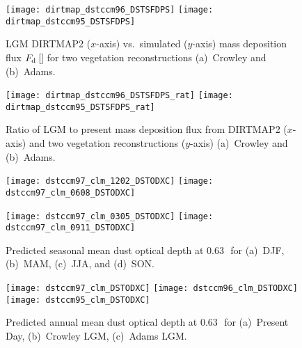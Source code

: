 \documentclass[final,dvips]{foils}
\begin{document}
\rotatefoilhead{\bgl
\Large\textcolor{blue}{\hfill LGM Dust \& Loess Deposition\hfill}}\vspace{-0.5in}\large
\begin{figure}
\centering
\texttt{[image: dirtmap\_dstccm96\_DSTSFDPS]}%
\texttt{[image: dirtmap\_dstccm95\_DSTSFDPS]}
\caption{
LGM DIRTMAP2 \cite[]{KoH01} ($x$-axis) vs.\ simulated
($y$-axis) mass deposition flux $F_{\mathrm{d}}$\,[\gxmSyr]
for two vegetation reconstructions (a)~Crowley and (b)~Adams. 
\label{fgr:DSTSFMBL}}
\end{figure}

\rotatefoilhead{\bgl
\Large\textcolor{blue}{\hfill LGM:Present Deposition Ratio\hfill}}\vspace{-0.5in}\large
\begin{figure}
\centering
\texttt{[image: dirtmap\_dstccm96\_DSTSFDPS\_rat]}%
\texttt{[image: dirtmap\_dstccm95\_DSTSFDPS\_rat]}
\caption{
Ratio of LGM to present mass deposition flux from DIRTMAP2
\cite[]{KoH01} ($x$-axis) and two vegetation reconstructions 
($y$-axis) (a)~Crowley and (b)~Adams. 
\label{fgr:DSTSFMBL}}
\end{figure}

\rotatefoilhead{\bgl
\Large\textcolor{blue}{\hfill Present Day Seasonal Optical Depth \hfill}}\vspace{-0.5in}\large
\begin{figure}
\centering
\texttt{[image: dstccm97\_clm\_1202\_DSTODXC]}%
\texttt{[image: dstccm97\_clm\_0608\_DSTODXC]}%

\texttt{[image: dstccm97\_clm\_0305\_DSTODXC]}%
\texttt{[image: dstccm97\_clm\_0911\_DSTODXC]}%
\caption{
Predicted seasonal mean dust optical depth at 0.63\,\um\ for (a)~DJF, 
(b)~MAM, (c)~JJA, and (d)~SON.
\label{fgr:dstodxc_csn}}
\end{figure}

\foilhead{\bgp
\Large\textcolor{blue}{\hfill LGM Annual Mean Optical Depth \hfill}}\vspace{-0.5in}\large
\begin{figure}
\centering
\texttt{[image: dstccm97\_clm\_DSTODXC]}\vfill
\texttt{[image: dstccm96\_clm\_DSTODXC]}\vfill
\texttt{[image: dstccm95\_clm\_DSTODXC]}
\caption{
Predicted annual mean dust optical depth at 0.63\,\um\ for
(a)~Present Day, (b)~Crowley LGM, (c)~Adams LGM.
\label{fgr:dstodxc}}
\end{figure}
\end{document}

